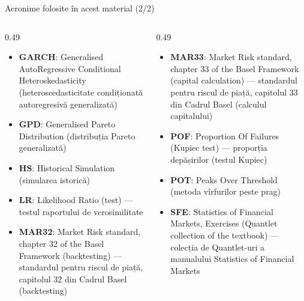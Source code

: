 \begin{frame}{Acronime folosite în acest material (2/2)}
\begin{columns}[T]
\begin{column}{0.49\textwidth}
\begin{itemize}\setlength{\itemsep}{0pt}
    \item \textbf{GARCH}: Generalised AutoRegressive Conditional Heteroskedasticity (heteroscedasticitate condiționată autoregresivă generalizată)
    \item \textbf{GPD}: Generalised Pareto Distribution (distribuția Pareto generalizată)
    \item \textbf{HS}: Historical Simulation (simularea istorică)
    \item \textbf{LR}: Likelihood Ratio (test) — testul raportului de verosimilitate
    \item \textbf{MAR32}: Market Risk standard, chapter 32 of the Basel Framework (backtesting) — standardul pentru riscul de piață, capitolul 32 din Cadrul Basel (backtesting)
\end{itemize}
\end{column}
\begin{column}{0.49\textwidth}
\begin{itemize}\setlength{\itemsep}{0pt}
    \item \textbf{MAR33}: Market Risk standard, chapter 33 of the Basel Framework (capital calculation) — standardul pentru riscul de piață, capitolul 33 din Cadrul Basel (calculul capitalului)
    \item \textbf{POF}: Proportion Of Failures (Kupiec test) — proporția depășirilor (testul Kupiec)
    \item \textbf{POT}: Peaks Over Threshold (metoda vîrfurilor peste prag)
    \item \textbf{SFE}: Statistics of Financial Markets, Exercises (Quantlet collection of the textbook) — colecția de Quantlet-uri a manualului Statistics of Financial Markets
\end{itemize}
\end{column}
\end{columns}
\end{frame}

